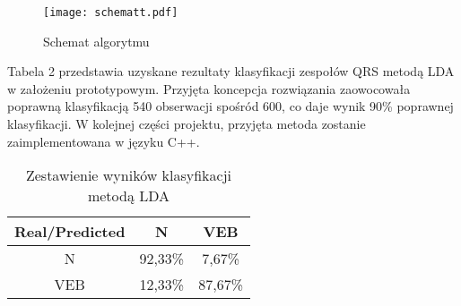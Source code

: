 \documentclass{article}
\begin{document}
\begin{figure}[ht]
\centering
\texttt{[image: schematt.pdf]}
\caption{Schemat algorytmu}
\end{figure}

Tabela 2 przedstawia uzyskane rezultaty klasyfikacji zespołów QRS metodą LDA w założeniu prototypowym. Przyjęta koncepcja rozwiązania zaowocowała poprawną klasyfikacją 540 obserwacji spośród 600, co daje wynik 90\% poprawnej klasyfikacji. W kolejnej części projektu, przyjęta metoda zostanie zaimplementowana w języku C++.

\begin{table}[h]
\centering
\caption{Zestawienie wyników klasyfikacji metodą LDA}
\label{my-label}
\begin{tabular}{c|c|c}
Real/Predicted & N       & VEB     \\ \hline
N              & 92,33\% & 7,67\%  \\ \hline
VEB            & 12,33\% & 87,67\%
\end{tabular}
\end{table}
\end{document}
